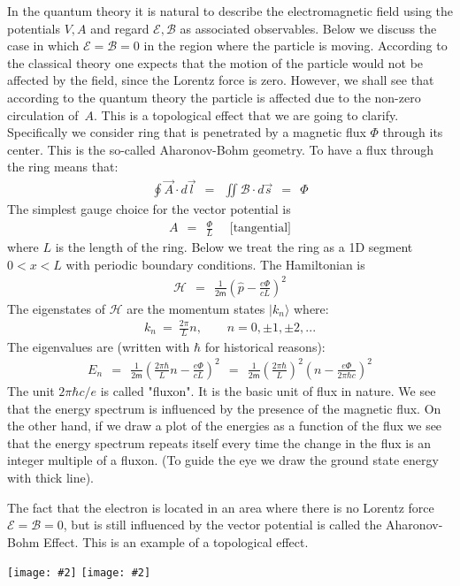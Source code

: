 \documentclass[onecolumn,fleqn, 11pt]{revtex4}
\newcommand{\mass}{\mathsf{m}}
\newcommand{\putgraph}[2][0.30\hsize]{\texttt{[image: \#2]}}
\newcommand{\beq}{\begin{eqnarray}}
\newcommand{\eeq}{\end{eqnarray}}
\begin{document}
In the quantum theory it is natural to describe the electromagnetic 
field using the potentials ${V,A}$ and regard ${\mathcal{E},\mathcal{B}}$ 
as associated observables. Below we discuss the case 
in which ${\mathcal{E}= \mathcal{B}=0}$ in the region where 
the particle is moving. According to the classical theory 
one expects that the motion of the particle would not 
be affected by the field, since the Lorentz force is zero. 
However, we shall see that according to the quantum theory 
the particle is affected due to the non-zero circulation of~${A}$. 
This is a topological effect that we are going to clarify. 
Specifically we consider ring that is penetrated by a magnetic 
flux ${\Phi}$ through its center. This is the so-called Aharonov-Bohm 
geometry. To have a flux through the ring means that:
\beq
\oint \vec{A} \cdot d\vec{l} \ \ = \ \ \iint \mathcal{B} \cdot d\vec{s} \ \ = \ \ \Phi 
\eeq
The simplest gauge choice for the vector potential is  
\beq
A \ \ = \ \ \frac{\Phi}{L}  \ \ \ \ \  \ \mbox{[tangential]}
\eeq
where $L$ is the length of the ring. 
Below we treat the ring as a 1D segment ${0<x<L}$ 
with periodic boundary conditions. 
The Hamiltonian is 
\beq
\mathcal{H} \ \ = \ \ \frac {1}{2\mass}\left(\hat{p}-\frac{e\Phi}{cL}\right)^2 
\eeq
The eigenstates of $\mathcal{H}$ 
are the momentum states ${|k_n \rangle}$ where:
\beq
k_n \ = \ \frac {2\pi }{L} n, 
\ \ \ \ \ \ \ \ \ n=0,\pm1,\pm2,...
\eeq
The eigenvalues are (written with $\hbar$ for historical reasons):
\beq
E_n \ \ = \ \ \frac{1}{2\mass}\left(\frac{2\pi\hbar}{L}n-\frac{e\Phi}{cL}\right)^2
\ \ = \ \ \frac{1}{2\mass}\left(\frac {2\pi\hbar}{L}\right)^2 \left(n-\frac{e\Phi}{2\pi\hbar c}\right)^2 
\eeq
The unit ${{2\pi \hbar c}/{e}}$ is called "fluxon". It is the basic unit of flux in nature. 
We see that the energy spectrum is influenced by the presence of the magnetic flux. 
On the other hand, if we draw a plot of the energies as a function of the flux 
we see that the energy spectrum repeats itself every time the change in the flux is 
an integer multiple of a fluxon. (To guide the eye we draw the ground state energy with thick line). 

The fact that the electron is located in an area where there is no Lorentz 
force ${\mathcal{E}= \mathcal{B}=0}$, but is still influenced by 
the vector potential is called the Aharonov-Bohm Effect. 
This is an example of a topological effect. 


\begin{center}
\putgraph[0.2\hsize]{RingWithFlux} 
\hspace*{0.2\hsize}
\putgraph[0.4\hsize]{RingWithFluxEnergySpectrum}
\end{center}
\end{document}
